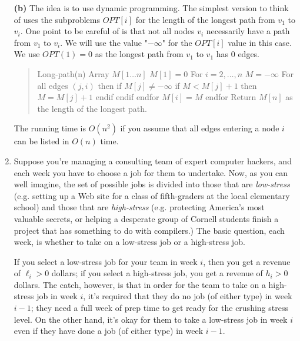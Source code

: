 \documentclass[12pt]{article}
\def\opt{{OPT}}
\def\opt{{OPT}}
\begin{document}
\begin{enumerate}
{{\bf (b)}
The idea is to use dynamic programming. The simplest version to think of uses
the subproblems $\opt[i]$ for the length of the longest path from $v_1$
to $v_i$. One point to be careful of is that not all nodes $v_i$
necessarily have a
path from $v_1$ to $v_i$. We will use the value "$-\infty$" for the
$\opt[i]$ value in this case. We use $\opt(1)=0$ as the longest
path from $v_1$ to $v_1$ has $0$ edges.

\begin{quote}
\begin{code}
Long-path(n)
  Array $M[1\ldots n]$
  $M[1]=0$
  For $i=2,\ldots,n$
     $M=-\infty$
     For all edges $(j,i)$ then
        if $M[j] \neq -\infty$
             if $M < M[j]+1$ then
                 $M=M[j]+1$
             endif
        endif
     endfor
     $M[i]=M$
  endfor
  Return $M[n]$ as the length of the longest path.
\end{code}
\end{quote}

The running time is $O(n^2)$ if you assume that all edges entering a node $i$
can be listed in $O(n)$ time.

}


\item

Suppose you're managing a consulting team of expert computer hackers,
and each week you have to choose a job for them to undertake.
Now, as you can well imagine, the set of possible jobs
is divided into those that are {\em low-stress}
(e.g. setting up a Web site for a class of fifth-graders
at the local elementary school)
and those that are {\em high-stress}
(e.g. protecting America's most valuable secrets,
or helping a desperate group of Cornell students
finish a project that has something to do with compilers.)
The basic question, each week, is whether to
take on a low-stress job or a high-stress job.

If you select a low-stress job for your team
in week $i$, then you get a revenue of $\ell_i > 0$ dollars;
if you select a high-stress job, you get a revenue
of $h_i > 0$ dollars.
The catch, however, is that in order for the team
to take on a high-stress job in week $i$,
it's required that they do no job (of either type)
in week $i-1$;
they need a full week of prep time to get ready for
the crushing stress level.
On the other hand, it's okay for them to take
a low-stress job in week $i$ even if they have
done a job (of either type) in week $i-1$.


\end{enumerate}
\end{document}
